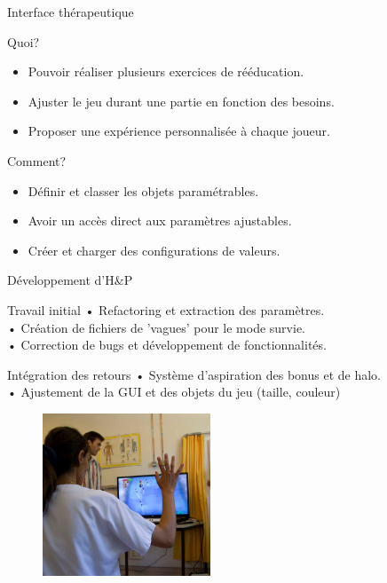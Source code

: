\documentclass{beamer}
\begin{document}
		\begin{frame}{Interface thérapeutique}
			\begin{block}{Quoi?}
				\begin{itemize}
					\item<1> Pouvoir réaliser plusieurs exercices de rééducation.
					\item<2> Ajuster le jeu durant une partie en fonction des besoins.
					\item<3> Proposer une expérience personnalisée à chaque joueur.
				\end{itemize}
			\end{block}
			\begin{exampleblock}{Comment?}
				\begin{itemize}
					\item<1> Définir et classer les objets paramétrables.
					\item<2> Avoir un accès direct aux paramètres ajustables.			
					\item<3> Créer et charger des configurations de valeurs.
				\end{itemize}
			\end{exampleblock}
		\end{frame}			
		
		\begin{frame}{Développement d'H\&P}
			\begin{block}{Travail initial}
				• Refactoring et extraction des paramètres.\\
				• Création de fichiers de 'vagues' pour le mode survie.\\
				• Correction de bugs et développement de fonctionnalités.
			\end{block}
			\begin{block}{Intégration des retours}
				• Système d'aspiration des bonus et de halo.\\
				• Ajustement de la GUI et des objets du jeu (taille, couleur)
			\end{block}
			\begin{figure}
				\includegraphics[width=5cm]{../images/test_lapeyronie_2.png}
			\end{figure}			
		\end{frame}
		
\end{document}
